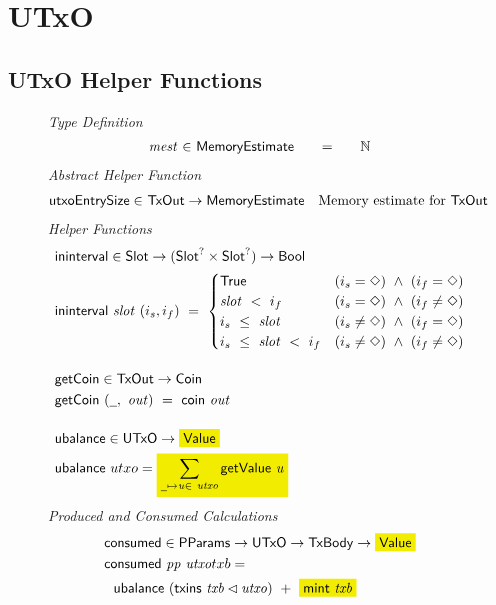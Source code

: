 \section{UTxO}
\label{sec:utxo}

\subsection*{UTxO Helper Functions}

\begin{figure}[htb]
  \emph{Type Definition}
  \begin{equation*}
    \begin{array}{r@{~\in~}l@{\qquad=\qquad}lr}
      \var{mest} & \MemoryEstimate & \N
    \end{array}
  \end{equation*}
  \emph{Abstract Helper Function}
  \begin{align*}
    \mathsf{utxoEntrySize} \in& ~\mathsf{TxOut} \to \mathsf{MemoryEstimate} & \text{Memory estimate for}~\mathsf{TxOut}
  \end{align*}
  \emph{Helper Functions}
  \begin{align*}
    & \fun{ininterval} \in \Slot \to (\Slot^? \times \Slot^?) \to \Bool \\
    & \fun{ininterval}~\var{slot}~(i_s, i_f) ~=~
    \begin{cases}
      \True & (i_s = \Nothing)~\wedge~(i_f = \Nothing) \\
      \var{slot}~<~i_f & (i_s = \Nothing)~\wedge~(i_f \neq \Nothing)\\
      i_s~\leq~\var{slot} & (i_s \neq \Nothing)~\wedge~(i_f = \Nothing) \\
      i_s~\leq~\var{slot}~<~i_f & (i_s \neq \Nothing)~\wedge~(i_f \neq \Nothing)
    \end{cases}
    \nextdef
    & \fun{getCoin} \in \TxOut \to \Coin \\
    & \fun{getCoin}~{(\wcard,~\var{out})} ~=~\fun{coin}~\var{out}
    \nextdef
    & \fun{ubalance} \in \UTxO \to \hldiff{\Value} \\
    & \fun{ubalance} ~ utxo = \hldiff{\sum_{\wcard\mapsto\var{u}\in~\var{utxo}} \fun{getValue}~\var{u}}
  \end{align*}
  \emph{Produced and Consumed Calculations}
  \begin{align*}
    & \fun{consumed} \in \PParams \to \UTxO \to \TxBody \to \hldiff{\Value} \\
    & \consumed{pp}{utxo}{txb} = \\
    & ~~\ubalance{(\txins{txb} \restrictdom \var{utxo})} ~+~ \hldiff{\fun{mint}~\var{txb}} \\

\end{align*}
\end{figure}
